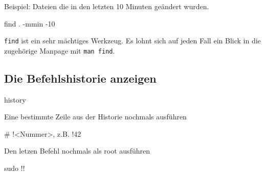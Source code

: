 \documentclass[]{article}
\newcommand{\code}[1]{\texttt{#1}}
\begin{document}
Beispiel: Dateien die in den letzten 10 Minuten geändert wurden.
\begin{bashcode}
find . -mmin -10
\end{bashcode}

\code{find} ist ein sehr mächtiges Werkzeug. Es lohnt sich auf jeden Fall ein Blick in die zugehörige Manpage mit \code{man find}.

\subsection{Die Befehlshistorie anzeigen}
\begin{bashcode}
history
\end{bashcode}

Eine bestimmte Zeile aus der Historie nochmals ausführen
\begin{bashcode}
# !<Nummer>, z.B.
!42
\end{bashcode}

Den letzen Befehl nochmals als root ausführen
\begin{bashcode}
sudo !!
\end{bashcode}

\printbibliography
\end{document}
